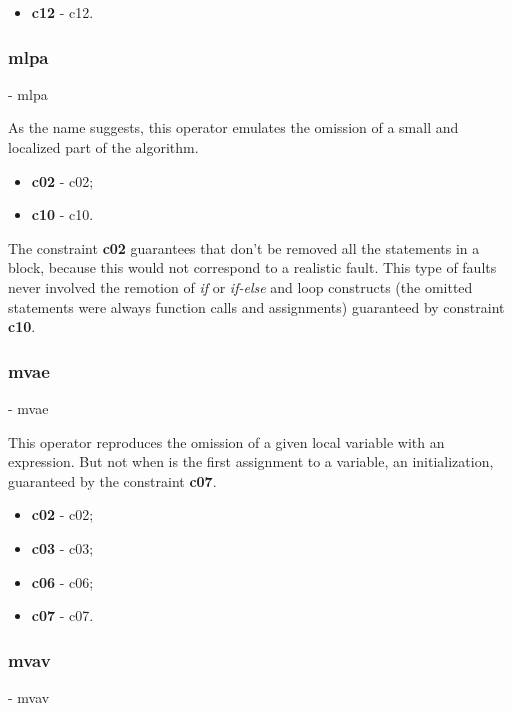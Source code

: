 	\begin{itemize}
		\item \textbf{\acs{c12}} - \Acl{c12}.
	\end{itemize}

	\subsubsection{\textbf{\acs{mlpa}}} - \Acl{mlpa}
	\hypertarget{mlpa}{}

	As the name suggests, this operator emulates the omission of a small and localized part of the algorithm.

	\begin{itemize}
		\item \textbf{\acs{c02}} - \Acl{c02};
		\item \textbf{\acs{c10}} - \Acl{c10}.
	\end{itemize}

	The constraint \textbf{\ac{c02}} guarantees that don't be removed all the statements in a block, because this would not correspond to a realistic fault. This type of faults never involved the remotion of \textit{if} or \textit{if-else} and loop constructs (the omitted statements were always function calls and assignments) guaranteed by constraint \textbf{\ac{c10}}.

	\subsubsection{\textbf{\acs{mvae}}} - \Acl{mvae}
	\hypertarget{mvae}{}

	This operator reproduces the omission of a given local variable with an expression. But not when is the first assignment to a variable, an initialization, guaranteed by the constraint \textbf{\acs{c07}}.

	\begin{itemize}
		\item \textbf{\acs{c02}} - \Acl{c02};
		\item \textbf{\acs{c03}} - \Acl{c03};
		\item \textbf{\acs{c06}} - \Acl{c06};
		\item \textbf{\acs{c07}} - \Acl{c07}.
	\end{itemize}

	\subsubsection{\textbf{\acs{mvav}}} - \Acl{mvav}
	\hypertarget{mvav}{}

